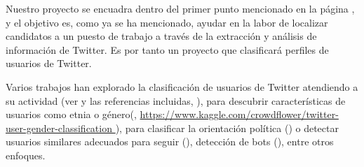 Nuestro proyecto se encuadra dentro del primer punto mencionado en la página 
\pageref{item:puntodeproyecto}, y el objetivo es, como ya se ha mencionado,
ayudar en la labor de localizar candidatos a un puesto de trabajo
a través de la extracción y análisis de información de Twitter.
Es por tanto un proyecto que clasificará perfiles de usuarios de Twitter.


Varios  trabajos han explorado la clasificación de usuarios de Twitter
atendiendo a su actividad (ver \cite{tesis_mariluz} y las referencias
incluidas, \cite{user_class5}), para descubrir 
características de usuarios como etnia o género(\cite{user_class1}, \url{https://www.kaggle.com/crowdflower/twitter-user-gender-classification }),
para clasificar la orientación política (\cite{user_class2}) o 
detectar usuarios similares adecuados para seguir (\cite{user_class3}),
detección de bots (\cite{user_class4}), 
entre otros enfoques.
 

